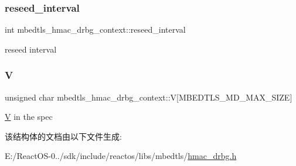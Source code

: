 \subsubsection{\texorpdfstring{reseed\+\_\+interval}{reseed\_interval}}
{\footnotesize\ttfamily int mbedtls\+\_\+hmac\+\_\+drbg\+\_\+context\+::reseed\+\_\+interval}

reseed interval \mbox{\label{structmbedtls__hmac__drbg__context_a3e426c343012174c037a462535d23715}} 
\subsubsection{\texorpdfstring{V}{V}}
{\footnotesize\ttfamily unsigned char mbedtls\+\_\+hmac\+\_\+drbg\+\_\+context\+::V\mbox{[}M\+B\+E\+D\+T\+L\+S\+\_\+\+M\+D\+\_\+\+M\+A\+X\+\_\+\+S\+I\+ZE\mbox{]}}

\hyperlink{struct_v}{V} in the spec 

该结构体的文档由以下文件生成\+:\begin{DoxyCompactItemize}
\item 
E\+:/\+React\+O\+S-\/0../sdk/include/reactos/libs/mbedtls/\hyperlink{hmac__drbg_8h}{hmac\+\_\+drbg.\+h}\end{DoxyCompactItemize}

